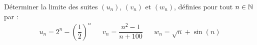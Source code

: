 \documentclass[a4paper,10pt,DIV15,BCOR0mm]{scrartcl}
\begin{document}
\color{red}

\begin{exercice}
Déterminer la limite des suites $(u_n)$, $(v_n)$ et $(w_n)$, définies
pour tout $n\in\mathbb{N}$ par :
\begin{align*}
u_n=2^n-\left(\dfrac12\right)^n&&v_n=\dfrac{n^2-1}{n+100}&&w_n=\sqrt{n}+\sin (n)
\end{align*}
\end{exercice}



\begin{exercice}
 
\end{exercice}
\end{document}
